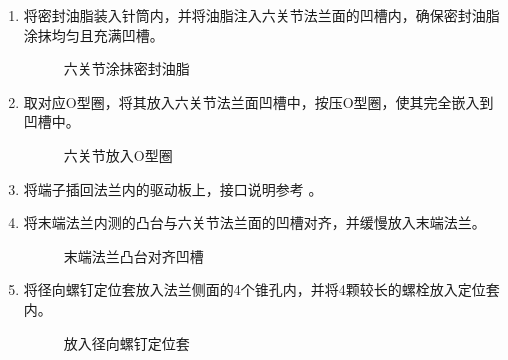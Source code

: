 \documentclass[a4paper,11pt,english,openany,oneside]{sphinxmanual}
\begin{document}
\sphinxAtStartPar
{}
\begin{enumerate}
%
\item {} 
\sphinxAtStartPar
将密封油脂装入针筒内，并将油脂注入六关节法兰面的凹槽内，确保密封油脂涂抹均匀且充满凹槽。

\begin{figure}[H]
\centering
\capstart

\noindent{}
\caption{六关节涂抹密封油脂}\label{\detokenize{_u66f4_u6362_u672b_u7aef_u6cd5_u5170:id13}}\end{figure}

\item {} 
\sphinxAtStartPar
取对应O型圈，将其放入六关节法兰面凹槽中，按压O型圈，使其完全嵌入到凹槽中。

\begin{figure}[H]
\centering
\capstart

\noindent{}
\caption{六关节放入O型圈}\label{\detokenize{_u66f4_u6362_u672b_u7aef_u6cd5_u5170:id14}}\end{figure}

\item {} 
\sphinxAtStartPar
将端子插回法兰内的驱动板上，接口说明参考 {\hyperref[\detokenize{_u66f4_u6362_u672b_u7aef_u6cd5_u5170:id3}]{}} 。

\item {} 
\sphinxAtStartPar
将末端法兰内测的凸台与六关节法兰面的凹槽对齐，并缓慢放入末端法兰。

\begin{figure}[H]
\centering
\capstart

\noindent{}
\caption{末端法兰凸台对齐凹槽}\label{\detokenize{_u66f4_u6362_u672b_u7aef_u6cd5_u5170:id15}}\end{figure}

\item {} 
\sphinxAtStartPar
将径向螺钉定位套放入法兰侧面的4个锥孔内，并将4颗较长的螺栓放入定位套内。

\begin{figure}[H]
\centering
\capstart

\noindent{}
\caption{放入径向螺钉定位套}\label{\detokenize{_u66f4_u6362_u672b_u7aef_u6cd5_u5170:id16}}\end{figure}


\end{enumerate}
\end{document}

